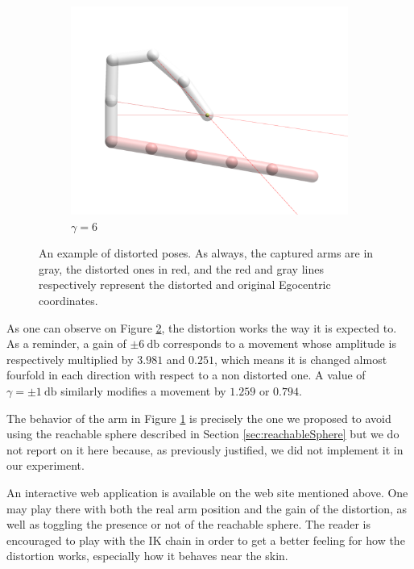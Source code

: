 \begin{figure}[h]
\begin{subfigure}[b]{.3\textwidth}
        \includegraphics[width=\textwidth]{Figures/distortions/distortions6.png}
        \caption{$\gamma = 6$}
        \label{subfig:gamma6}
    \end{subfigure}
        
    \caption{An example of distorted poses. As always, the captured arms are in gray, the distorted ones in red, and the red and gray lines respectively represent the distorted and original Egocentric coordinates.}
    \label{fig:distortionExamples}
\end{figure}

As one can observe on Figure \ref{fig:distortionExamples}, the distortion works the way it is expected to. As a reminder, a gain of $\pm\SI{6}{\decibel}$ corresponds to a movement whose amplitude is respectively multiplied by $3.981$ and $0.251$, which means it is changed almost fourfold in each direction with respect to a non distorted one. A value of $\gamma = \pm\SI{1}{\decibel}$ similarly modifies a movement by $1.259$ or $0.794$.

The behavior of the arm in Figure \ref{subfig:gamma6} is precisely the one we proposed to avoid using the reachable sphere described in Section \ref{sec:reachableSphere} but we do not report on it here because, as previously justified, we did not implement it in our experiment.

An interactive web application is available on the web site mentioned above. One may play there with both the real arm position and the gain of the distortion, as well as toggling the presence or not of the reachable sphere. The reader is encouraged to play with the IK chain in order to get a better feeling for how the distortion works, especially how it behaves near the skin.

